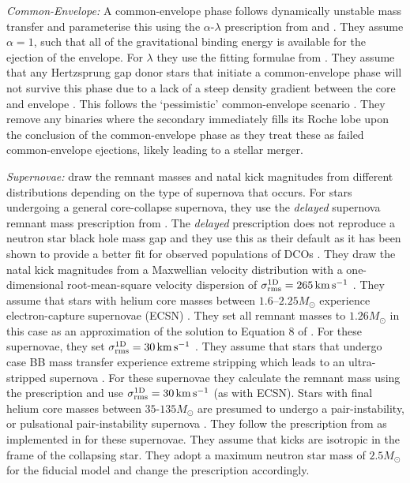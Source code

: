 \textit{Common-Envelope:} A common-envelope phase follows dynamically unstable mass transfer and \citet{Broekgaarden+2021,Broekgaarden+2021b} parameterise this using the $\alpha$-$\lambda$ prescription from \citet{Webbink+1984} and \citet{deKool+1990}. They assume $\alpha = 1$, such that all of the gravitational binding energy is available for the ejection of the envelope. For $\lambda$ they use the fitting formulae from \citet{Xu+2010, Xu+2010a}. They assume that any Hertzsprung gap donor stars that initiate a common-envelope phase will not survive this phase due to a lack of a steep density gradient between the core and envelope \citep{Taam+2000, Ivanova+2004, Klencki+2021}. This follows the `pessimistic' common-envelope scenario \citep[c.f.][]{Belczynski+2007}. They remove any binaries where the secondary immediately fills its Roche lobe upon the conclusion of the common-envelope phase as they treat these as failed common-envelope ejections, likely leading to a stellar merger.

\textit{Supernovae:} \citet{Broekgaarden+2021,Broekgaarden+2021b} draw the remnant masses and natal kick magnitudes from different distributions depending on the type of supernova that occurs. For stars undergoing a general core-collapse supernova, they use the \textit{delayed} supernova remnant mass prescription from \citet{Fryer+2012}. The \textit{delayed} prescription does not reproduce a neutron star black hole mass gap and they use this as their default as it has been shown to provide a better fit for observed populations of DCOs \citep[e.g.][]{Vigna-Gomez+2018}. They draw the natal kick magnitudes from a Maxwellian velocity distribution with a one-dimensional root-mean-square velocity dispersion of $\sigma_{\rm rms}^{\rm 1D} = 265 \unit{km}{s^{-1}}$ \citep{Lyne+1994, Hobbs+2005}. They assume that stars with helium core masses between $1.6$--$2.25 \unit{M_{\odot}}$ \citep{Hurley+2002} experience electron-capture supernovae (ECSN) \citep{Nomoto+1984, Nomoto+1987, Ivanova+2008}. They set all remnant masses to $1.26 \unit{M_{\odot}}$ in this case as an approximation of the solution to Equation 8 of \citet{Timmes+1996}. For these supernovae, they set $\sigma_{\rm rms}^{\rm 1D} = 30 \unit{km}{s^{-1}}$ \citep[e.g.][]{Pfahl+2002, Podsiadlowski+2004}. They assume that stars that undergo case BB mass transfer \citep{Dewi+2002} experience extreme stripping which leads to an ultra-stripped supernova \citep{Tauris+2013, Tauris+2015}. For these supernovae they calculate the remnant mass using the \citet{Fryer+2012} prescription and use $\sigma_{\rm rms}^{\rm 1D} = 30 \unit{km}{s^{-1}}$ (as with ECSN). Stars with final helium core masses between $35$-$135 \unit{M_{\odot}}$ are presumed to undergo a pair-instability, or pulsational pair-instability supernova \citep[e.g.][]{Woosley+2007, Farmer+2019}. They follow the prescription from \citet{Marchant+2019} as implemented in \citep{Stevenson+2019} for these supernovae. They assume that kicks are isotropic in the frame of the collapsing star. They adopt a maximum neutron star mass of $2.5 \unit{M_{\odot}}$ \citep[e.g.][]{Kalogera+1996, Fryer+2015, Margalit+2017} for the fiducial model and change the \citet{Fryer+2012} prescription accordingly.

